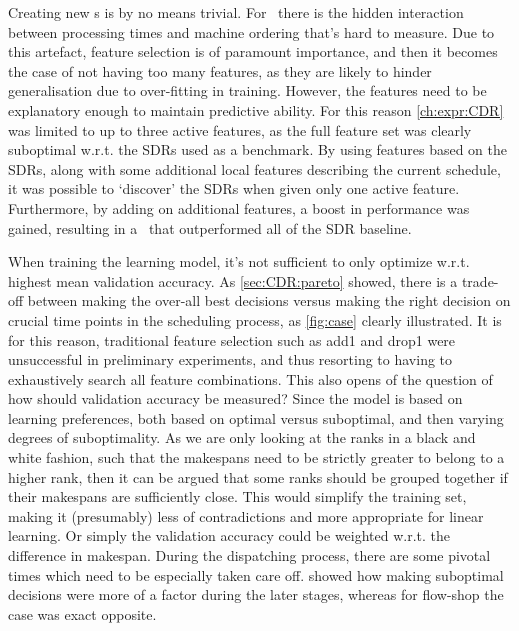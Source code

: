 Creating new \dr s is by no means trivial. For \jsp\ there is 
the hidden interaction between processing times and machine ordering that's 
hard to measure.
Due to this artefact, feature selection is of paramount importance, and then it 
becomes the case of not having too many features, as they are likely to hinder 
generalisation due to over-fitting in training. However, the features need to 
be explanatory enough to maintain predictive ability. 
For this reason \cref{ch:expr:CDR} was limited to up to three active features, 
as the full feature set was clearly suboptimal w.r.t. the SDRs used as a 
benchmark. 
By using features based on the SDRs, along with some additional local features 
describing the current schedule, it was possible to `discover' the SDRs when 
given only one active feature. %
Furthermore, by adding on additional features, a boost in performance was 
gained, resulting in a \cdr\ that outperformed all of the 
SDR baseline. 

When training the learning model, it's not sufficient to only optimize w.r.t. 
highest mean validation accuracy. As \cref{sec:CDR:pareto} showed, there is a 
trade-off between making the over-all best decisions versus making the right 
decision on crucial time points in the scheduling process, as \cref{fig:case} 
clearly illustrated. It is for this reason, traditional feature selection such 
as add1 and drop1 were unsuccessful in preliminary experiments, and thus 
resorting to having to exhaustively search all feature combinations.
This also opens of the question of how should validation accuracy be measured? 
Since the model is based on learning preferences, both based on optimal versus 
suboptimal, and then varying degrees of suboptimality. As we are only looking 
at the ranks in a black and white fashion, such that the makespans need to be 
strictly greater to belong to a higher rank, then it can be argued that some 
ranks should be grouped together if their makespans are sufficiently close. 
This would simplify the training set, making it (presumably) less of 
contradictions and more appropriate for linear learning. Or simply the 
validation accuracy could be weighted w.r.t. the  difference in 
makespan.
During the dispatching process, there are some pivotal times which need to be 
especially taken care off.  showed how making suboptimal 
decisions were more of a factor during the later stages, whereas for flow-shop 
the case was exact opposite. 

